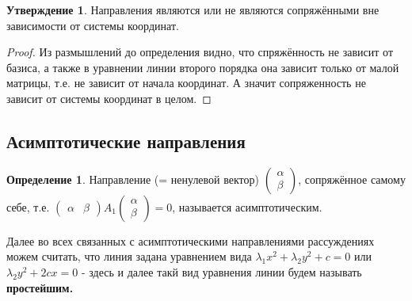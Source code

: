\documentclass[a4paper, 12pt]{article}
\theoremstyle{definition}
\newtheorem*{definition}{Определение}
\newtheorem*{subtheorem}{Утверждение}
\begin{document}
	\begin{subtheorem}
		Направления являются или не являются сопряжёнными вне зависимости от системы координат.
	\end{subtheorem}
	\begin{proof}
		Из размышлений до определения видно, что спряжённость не зависит от базиса, а также в уравнении линии второго порядка она зависит только от малой матрицы, т.е. не зависит от начала координат. А значит сопряженность не зависит от системы координат в целом.
	\end{proof}
	\subsection{Асимптотические направления}
	\begin{definition}
		Направление (= ненулевой вектор) $\begin{pmatrix} \alpha \\ \beta \end{pmatrix}$, сопряжённое самому себе, т.е. $\begin{pmatrix} \alpha & \beta \end{pmatrix}A_1\begin{pmatrix} \alpha \\ \beta \end{pmatrix} = 0$, называется асимптотическим.
	\end{definition}
	Далее во всех связанных с асимптотическими направлениями рассуждениях можем считать, что линия задана уравнением вида $\lambda_1x^2 + \lambda_2y^2 + c = 0$ или $\lambda_2y^2 + 2cx = 0$ - здесь и далее такй вид уравнения линии будем называть \bfseries простейшим\mdseries.
\end{document}

